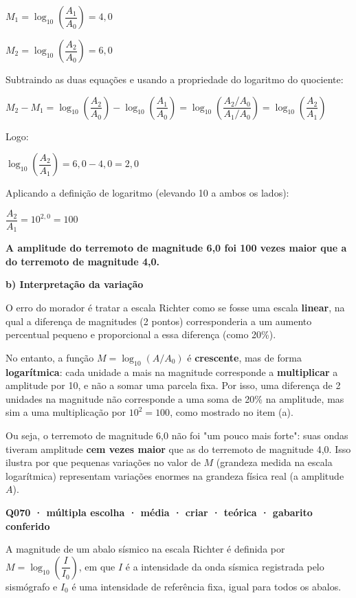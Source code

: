 \documentclass[11pt,a4paper]{article}
\begin{document}
$M_1 = \log_{10}\left(\dfrac{A_1}{A_0}\right) = 4{,}0$

$M_2 = \log_{10}\left(\dfrac{A_2}{A_0}\right) = 6{,}0$

Subtraindo as duas equações e usando a propriedade do logaritmo do quociente:

$M_2 - M_1 = \log_{10}\left(\dfrac{A_2}{A_0}\right) - \log_{10}\left(\dfrac{A_1}{A_0}\right) = \log_{10}\left(\dfrac{A_2/A_0}{A_1/A_0}\right) = \log_{10}\left(\dfrac{A_2}{A_1}\right)$

Logo:

$\log_{10}\left(\dfrac{A_2}{A_1}\right) = 6{,}0 - 4{,}0 = 2{,}0$

Aplicando a definição de logaritmo (elevando 10 a ambos os lados):

$\dfrac{A_2}{A_1} = 10^{2{,}0} = 100$

\textbf{A amplitude do terremoto de magnitude 6,0 foi 100 vezes maior que a do terremoto de magnitude 4,0.}

\textbf{b) Interpretação da variação}

O erro do morador é tratar a escala Richter como se fosse uma escala \textbf{linear}, na qual a diferença de magnitudes (2 pontos) corresponderia a um aumento percentual pequeno e proporcional a essa diferença (como 20\%).

No entanto, a função $M = \log_{10}(A/A_0)$ é \textbf{crescente}, mas de forma \textbf{logarítmica}: cada unidade a mais na magnitude corresponde a \textbf{multiplicar} a amplitude por 10, e não a somar uma parcela fixa. Por isso, uma diferença de 2 unidades na magnitude não corresponde a uma soma de 20\% na amplitude, mas sim a uma multiplicação por $10^2 = 100$, como mostrado no item (a).

Ou seja, o terremoto de magnitude 6,0 não foi "um pouco mais forte": suas ondas tiveram amplitude \textbf{cem vezes maior} que as do terremoto de magnitude 4,0. Isso ilustra por que pequenas variações no valor de $M$ (grandeza medida na escala logarítmica) representam variações enormes na grandeza física real (a amplitude $A$).

\bigskip\noindent\textbf{Q070 · múltipla escolha · média · criar · teórica · gabarito conferido}\par\nopagebreak
A magnitude de um abalo sísmico na escala Richter é definida por $M = \log_{10}\left(\dfrac{I}{I_0}\right)$, em que $I$ é a intensidade da onda sísmica registrada pelo sismógrafo e $I_0$ é uma intensidade de referência fixa, igual para todos os abalos.
\end{document}

